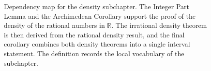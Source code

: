 \begin{figure}[H]
\begin{tikzpicture}[
    >=Latex,
    node distance=1.5cm and 0.6cm, %
    every node/.style={align=center}
]
\end{tikzpicture}

\begin{center}
\DependencyFigureLegend
\end{center}

\caption{Dependency map for the density subchapter. The Integer Part Lemma and the Archimedean Corollary support the proof of the density of the rational numbers in $\mathbb{R}$. The irrational density theorem is then derived from the rational density result, and the final corollary combines both density theorems into a single interval statement. The definition records the local vocabulary of the subchapter.}
\label{fig:density-dependency-map}
\end{figure}
